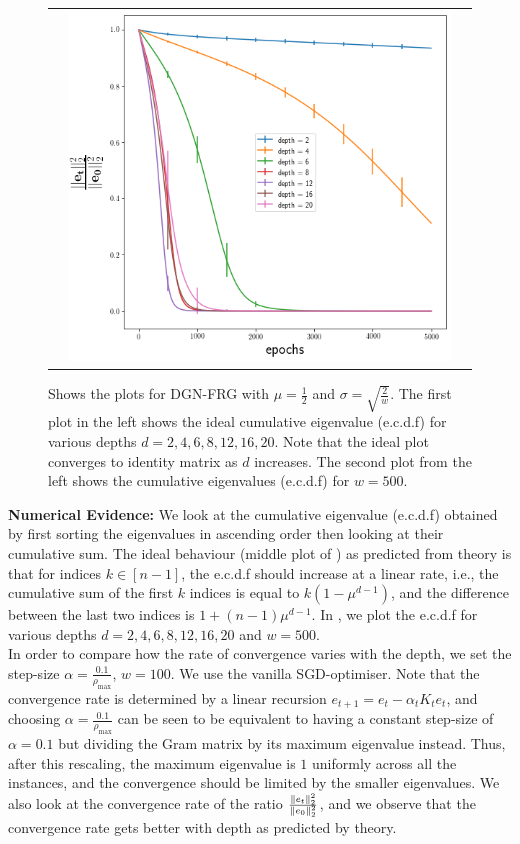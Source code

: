 \begin{figure}
{\begin{tabular}{ccc}
&
\includegraphics[scale=0.4]{figs/dgn-fra-conv-w500.png}
\end{tabular}
}
\caption{Shows the plots for DGN-FRG with $\mu=\frac{1}{2}$ and $\sigma=\sqrt{\frac{2}{w}}$. The first plot in the left shows the ideal cumulative eigenvalue (e.c.d.f) for various depths $d=2,4,6,8,12,16,20$. Note that the ideal plot converges to identity matrix as $d$ increases. The second plot from the left shows the cumulative eigenvalues (e.c.d.f) for $w=500$. }
\label{fig:dgn-frg-gram-ecdf}
\end{figure}
\textbf{Numerical Evidence:} We look at the cumulative eigenvalue (e.c.d.f) obtained by first sorting the eigenvalues in ascending order then looking at their cumulative sum. The ideal behaviour (middle plot of ) as predicted from theory is that for indices $k\in[n-1]$, the e.c.d.f should increase at a linear rate, i.e., the cumulative sum of the first $k$ indices is equal to $k(1-\mu^{d-1})$, and the difference between the last two indices is $1+(n-1)\mu^{d-1}$. In , we plot the e.c.d.f for various depths $d=2,4,6,8,12,16,20$ and $w=500$. \hfill\\
In order to compare how the rate of convergence varies with the depth, we set the step-size $\alpha=\frac{0.1}{\rho_{\max}}$, $w=100$. We use the vanilla SGD-optimiser. Note that the convergence rate is determined by a linear recursion $e_{t+1}=e_t-\alpha_t K_te_t$, and choosing $\alpha=\frac{0.1}{\rho_{\max}}$ can be seen to be equivalent to having a constant step-size of $\alpha=0.1$ but dividing the Gram matrix by its maximum eigenvalue instead. Thus, after this rescaling, the maximum eigenvalue is $1$ uniformly across all the instances, and the convergence should be limited by the smaller eigenvalues. We also look at the convergence rate of the ratio $\frac{\|e_t\|^2_2}{\|e_0\|^2_2}$, and we observe that the convergence rate gets better with depth as predicted by theory.


